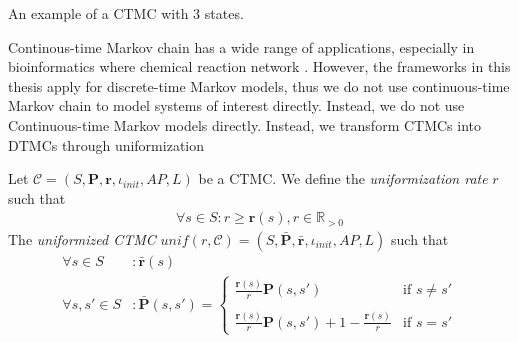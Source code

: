 \begin{example}[CTMC]
    An example of a CTMC with 3 states.
    \begin{figure}[H]
        \centering
        \label{fig:ctmc}
    \end{figure}
    \label{example:ctmc}
\end{example}

Continous-time Markov chain has a wide range of applications, especially in bioinformatics where
chemical reaction network \cite{feinberg1980chemical} \cite{anderson2011continuous}. However, the
frameworks in this thesis apply for discrete-time Markov models, thus we do not use continuous-time
Markov chain to model systems of interest directly. Instead, we do not use Continuous-time Markov
models directly. Instead, we transform CTMCs into DTMCs through uniformization \cite{katoen2016probabilistic}
\begin{definition}
    Let $\mathcal{C} = (S,\mathbf{P}, \mathbf{r}, \iota_{init}, AP, L)$ be a CTMC. We define the
    \textit{uniformization rate} $r$ such that
    \begin{align*}
        \forall s\in S: r \geq \mathbf{r}(s), r\in\mathbb{R}_{>0}
    \end{align*}
    The \textit{uniformized CTMC} $unif(r, \mathcal{C})=(S, \bar{\mathbf{P}}, \bar{\mathbf{r}}, \iota_{init}, AP, L )$ such that
    \begin{align*}
        \forall s\in S     & : \bar{\mathbf{r}}(s)     \\
        \forall s, s'\in S & : \bar{\mathbf{P}}(s,s')=
        \begin{cases}
            \frac{\mathbf{r}(s)}{r}\mathbf{P}(s,s')                               & \text{if $s \neq s'$} \\ \quad \\
            \frac{\mathbf{r}(s)}{r}\mathbf{P}(s,s') + 1 - \frac{\mathbf{r}(s)}{r} & \text{if $s = s'$}
        \end{cases}
    \end{align*}
\end{definition}

